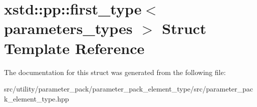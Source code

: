 \hypertarget{structxstd_1_1pp_1_1first__type}{\section{xstd\-:\-:pp\-:\-:first\-\_\-type$<$ parameters\-\_\-types $>$ Struct Template Reference}
\label{structxstd_1_1pp_1_1first__type}
}


The documentation for this struct was generated from the following file\-:\begin{DoxyCompactItemize}
\item 
src/utility/parameter\-\_\-pack/parameter\-\_\-pack\-\_\-element\-\_\-type/src/parameter\-\_\-pack\-\_\-element\-\_\-type.\-hpp\end{DoxyCompactItemize}
